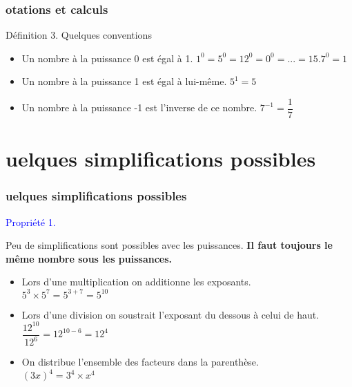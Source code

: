 \documentclass{beamer}
\begin{document}
\begin{frame}
  \frametitle{otations et calculs}

  \begin{alertblock}{Définition 3. Quelques conventions}

    \begin{itemize}
    \item  Un nombre à la puissance 0 est égal à 1. \newline
      $1^0 = 5^0 = 12^0 = 0^0 = ... = 15.7^0 = 1$ \\
    \item Un nombre à la puissance 1 est égal à lui-même. \newline
      $5^1 = 5$
    \item Un nombre à la puissance -1 est l'inverse de ce nombre. \newline
      $7^{-1} = \dfrac{1}{7}$
    \end{itemize}

  \end{alertblock}

\end{frame}

\section{uelques simplifications possibles}

\begin{frame}
  \frametitle{uelques simplifications possibles}

  \begin{block}{\textcolor{blue}{Propriété 1.}}

	Peu de simplifications sont possibles avec les puissances. \textbf{Il faut toujours le même nombre sous les puissances.}
	
    \begin{itemize}
    \item Lors d'une multiplication on additionne les exposants. \\
      $5^3 \times 5^7 = 5^{3+7} = 5^{10}$
    \item Lors d'une division on soustrait l'exposant du dessous à celui de haut. \\
      $\dfrac{12^{10}}{12^{6}} = 12^{10 - 6} = 12^4$
    \item On distribue l'ensemble des facteurs dans la parenthèse. \\
      $(3 x)^4 = 3^4 \times x^4$
    \end{itemize}
  
  \end{block}
\end{frame}
\end{document}
